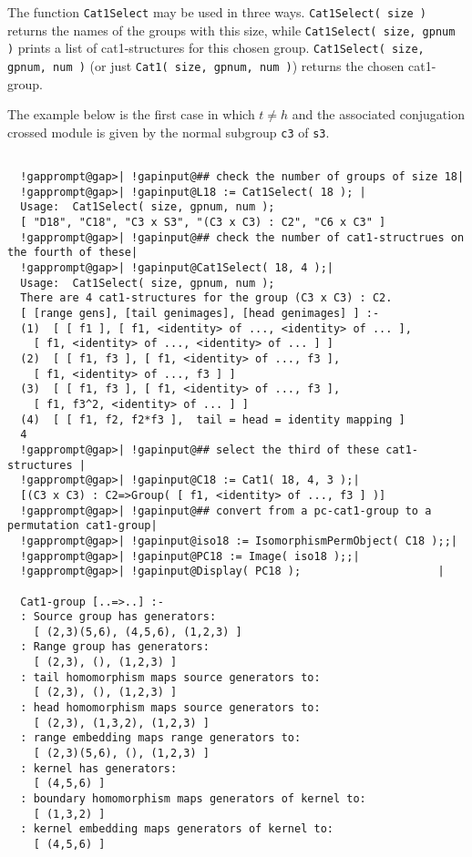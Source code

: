 \documentclass[a4paper,11pt]{report}
\begin{document}
{{{ The function \texttt{Cat1Select} may be used in three ways. \texttt{Cat1Select( size )} returns the names of the groups with this size, while \texttt{Cat1Select( size, gpnum )} prints a list of cat1-structures for this chosen group. \texttt{Cat1Select( size, gpnum, num )} (or just \texttt{Cat1( size, gpnum, num )}) returns the chosen cat1-group. 

 The example below is the first case in which $t \neq h$ and the associated conjugation crossed module is given by the normal subgroup \texttt{c3} of \texttt{s3}. }

 
\begin{Verbatim}[commandchars=!@|,fontsize=\small,frame=single,label=Example]
  
  !gapprompt@gap>| !gapinput@## check the number of groups of size 18|
  !gapprompt@gap>| !gapinput@L18 := Cat1Select( 18 ); |
  Usage:  Cat1Select( size, gpnum, num );
  [ "D18", "C18", "C3 x S3", "(C3 x C3) : C2", "C6 x C3" ]
  !gapprompt@gap>| !gapinput@## check the number of cat1-structrues on the fourth of these|
  !gapprompt@gap>| !gapinput@Cat1Select( 18, 4 );|
  Usage:  Cat1Select( size, gpnum, num );
  There are 4 cat1-structures for the group (C3 x C3) : C2.
  [ [range gens], [tail genimages], [head genimages] ] :-
  (1)  [ [ f1 ], [ f1, <identity> of ..., <identity> of ... ], 
    [ f1, <identity> of ..., <identity> of ... ] ]
  (2)  [ [ f1, f3 ], [ f1, <identity> of ..., f3 ], 
    [ f1, <identity> of ..., f3 ] ]
  (3)  [ [ f1, f3 ], [ f1, <identity> of ..., f3 ], 
    [ f1, f3^2, <identity> of ... ] ]
  (4)  [ [ f1, f2, f2*f3 ],  tail = head = identity mapping ]
  4
  !gapprompt@gap>| !gapinput@## select the third of these cat1-structures |
  !gapprompt@gap>| !gapinput@C18 := Cat1( 18, 4, 3 );|
  [(C3 x C3) : C2=>Group( [ f1, <identity> of ..., f3 ] )]
  !gapprompt@gap>| !gapinput@## convert from a pc-cat1-group to a permutation cat1-group|
  !gapprompt@gap>| !gapinput@iso18 := IsomorphismPermObject( C18 );;|
  !gapprompt@gap>| !gapinput@PC18 := Image( iso18 );;|
  !gapprompt@gap>| !gapinput@Display( PC18 );                     |
  
  Cat1-group [..=>..] :- 
  : Source group has generators:
    [ (2,3)(5,6), (4,5,6), (1,2,3) ]
  : Range group has generators:
    [ (2,3), (), (1,2,3) ]
  : tail homomorphism maps source generators to:
    [ (2,3), (), (1,2,3) ]
  : head homomorphism maps source generators to:
    [ (2,3), (1,3,2), (1,2,3) ]
  : range embedding maps range generators to:
    [ (2,3)(5,6), (), (1,2,3) ]
  : kernel has generators:
    [ (4,5,6) ]
  : boundary homomorphism maps generators of kernel to:
    [ (1,3,2) ]
  : kernel embedding maps generators of kernel to:
    [ (4,5,6) ]
  

\end{Verbatim}}}
\end{document}
